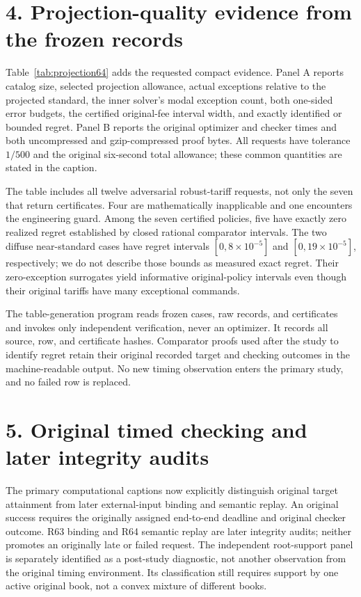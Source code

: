 \section*{4. Projection-quality evidence from the frozen records}
Table~\ref{tab:projection64} adds the requested compact evidence. Panel A reports catalog size, selected projection allowance, actual exceptions relative to the projected standard, the inner solver's modal exception count, both one-sided error budgets, the certified original-fee interval width, and exactly identified or bounded regret. Panel B reports the original optimizer and checker times and both uncompressed and gzip-compressed proof bytes. All requests have tolerance $1/500$ and the original six-second total allowance; these common quantities are stated in the caption.

The table includes all twelve adversarial robust-tariff requests, not only the seven that return certificates. Four are mathematically inapplicable and one encounters the engineering guard. Among the seven certified policies, five have exactly zero realized regret established by closed rational comparator intervals. The two diffuse near-standard cases have regret intervals $[0,8\times10^{-5}]$ and $[0,19\times10^{-5}]$, respectively; we do not describe those bounds as measured exact regret. Their zero-exception surrogates yield informative original-policy intervals even though their original tariffs have many exceptional commands.

The table-generation program reads frozen cases, raw records, and certificates and invokes only independent verification, never an optimizer. It records all source, row, and certificate hashes. Comparator proofs used after the study to identify regret retain their original recorded target and checking outcomes in the machine-readable output. No new timing observation enters the primary study, and no failed row is replaced.

\section*{5. Original timed checking and later integrity audits}
The primary computational captions now explicitly distinguish original target attainment from later external-input binding and semantic replay. An original success requires the originally assigned end-to-end deadline and original checker outcome. R63 binding and R64 semantic replay are later integrity audits; neither promotes an originally late or failed request. The independent root-support panel is separately identified as a post-study diagnostic, not another observation from the original timing environment. Its classification still requires support by one active original book, not a convex mixture of different books.


